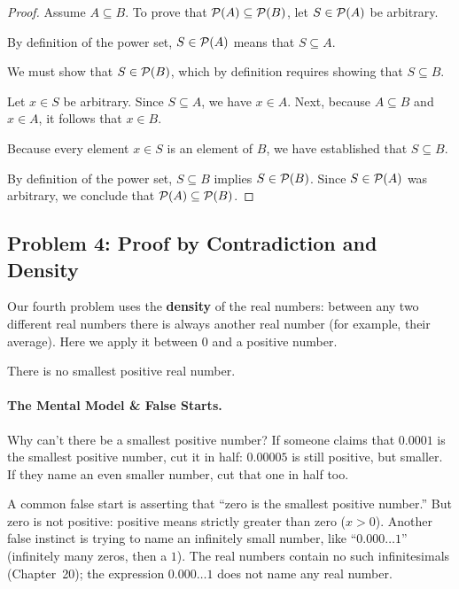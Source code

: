 \begin{proof}
Assume $A \subseteq B$. To prove that $\mathcal{P}(A) \subseteq \mathcal{P}(B)$, let $S \in \mathcal{P}(A)$ be arbitrary.

By definition of the power set, $S \in \mathcal{P}(A)$ means that $S \subseteq A$.

We must show that $S \in \mathcal{P}(B)$, which by definition requires showing that $S \subseteq B$.

Let $x \in S$ be arbitrary. Since $S \subseteq A$, we have $x \in A$. Next, because $A \subseteq B$ and $x \in A$, it follows that $x \in B$.

Because every element $x \in S$ is an element of $B$, we have established that $S \subseteq B$.

By definition of the power set, $S \subseteq B$ implies $S \in \mathcal{P}(B)$. Since $S \in \mathcal{P}(A)$ was arbitrary, we conclude that $\mathcal{P}(A) \subseteq \mathcal{P}(B)$.
\end{proof}

\subsection{Problem 4: Proof by Contradiction and Density}

Our fourth problem uses the \textbf{density} of the real numbers: between any two different real numbers there is always another real number (for example, their average). Here we apply it between $0$ and a positive number.

\begin{theorem}
There is no smallest positive real number.
\end{theorem}

\paragraph{The Mental Model \& False Starts.}
Why can't there be a smallest positive number? If someone claims that $0.0001$ is the smallest positive number, cut it in half: $0.00005$ is still positive, but smaller. If they name an even smaller number, cut that one in half too.

A common false start is asserting that ``zero is the smallest positive number.'' But zero is not positive: positive means strictly greater than zero ($x > 0$). Another false instinct is trying to name an infinitely small number, like ``$0.000\dots1$'' (infinitely many zeros, then a $1$). The real numbers contain no such infinitesimals (Chapter~20); the expression $0.000\dots1$ does not name any real number.

